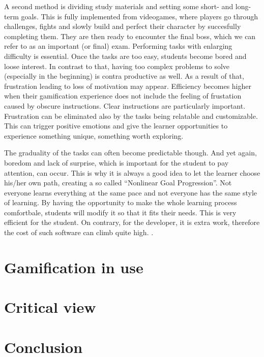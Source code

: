 \documentclass[10pt,english,a4paper]{article}
\begin{document}
	A second method is dividing study materials and setting some short- and long-term goals. This is fully implemented from videogames, where players go through challenges, fights and slowly build and perfect their character by succesfully completing them.
	They are then ready to encounter the final boss, which we can refer to as an important (or final) exam. 
	Performing tasks with enlarging difficulty is essential. Once the tasks are too easy, students become bored and loose interest. In contrast to that, having too complex problems to solve (especially in the beginning) is contra productive as well. 
	As a result of that, frustration leading to loss of motivation may appear. Efficiency becomes higher when their gamification experience does not include the feeling of frustation caused by obscure instructions. Clear instructions are particularly important. \cite{Raymer} 
	Frustration can be eliminated also by the tasks being relatable and customizable. This can trigger positive emotions and give the learner opportunities to experience something unique, something worth exploring. \cite{ AL-Smadi}
	
	The graduality of the tasks can often become predictable though. And yet again, boredom and lack of surprise, which is important for the student to pay attention, can occur. This is why it is always a good idea to let the learner choose his/her own path, creating a so called “Nonlinear Goal Progression”.
	Not everyone learns everything at the same pace and not everyone has the same style of learning. By having the opportunity to make the whole learning process comfortbale, students will modify it so that it fits their needs. 
	This is very efficient for the student. On contrary, for the developer, it is extra work, therefore the cost of such software can climb quite high. \cite{Raymer}.





\section{Gamification in use} \label{section4}



\section{Critical view} \label{section5}



\section{Conclusion} \label{section6}





\end{document}
